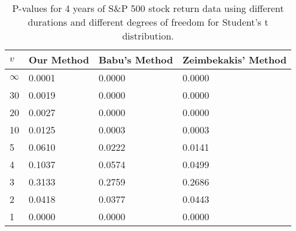 \begin{table}[ht]
\centering
\caption{P-values for 4 years of S\&P 500 stock return 
                   data using different durations
  and different degrees of freedom for Student's t distribution.} 
\label{table:SP5004}
\begin{tabular}{llll}
  \hline
$v$ & Our Method & Babu's Method & Zeimbekakis' Method \\ 
  \hline
$\infty$ & 0.0001 & 0.0000 & 0.0000 \\ 
  30 & 0.0019 & 0.0000 & 0.0000 \\ 
  20 & 0.0027 & 0.0000 & 0.0000 \\ 
  10 & 0.0125 & 0.0003 & 0.0003 \\ 
  5 & 0.0610 & 0.0222 & 0.0141 \\ 
  4 & 0.1037 & 0.0574 & 0.0499 \\ 
  3 & 0.3133 & 0.2759 & 0.2686 \\ 
  2 & 0.0418 & 0.0377 & 0.0443 \\ 
  1 & 0.0000 & 0.0000 & 0.0000 \\ 
   \hline
\end{tabular}
\end{table}

